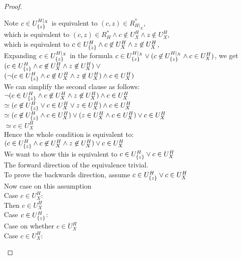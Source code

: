 \begin{proof}
\begin{tabbedproof}
\oo Note $c \in U^{H|_{X}}_{\{{z}\}}$ is equivalent to $(c,z) \in R^*_{H|_{X}}$, \\
\oo which is equivalent to  $(c, z) \in R^*_H \land c \not\in U^H_{X} \land z \not\in U^H_{X}$, \\
\oo which is equivalent to  $c \in U^H_{\{{z}\}} \land c \not\in U^H_{X} \land z \not\in U^H_{X}$, \\
\oo Expanding $c \in U^{H|_X}_{\{{z}\}}$ in the formula $c \in U^{H|_{X}}_{\{{z}\}} \vee (c \not\in U^{H|_{X}}_{\{{z}\}} \land c \in U^H_{X})$, we get \\
\oox $(c \in U^H_{\{{z}\}} \land c \not\in U^H_{X} \land z \not\in U^H_{X}) \;\vee$ \\
\oox $(\lnot(c \in U^H_{\{{z}\}} \land c \not\in U^H_{X} \land z \not\in U^H_{X}) \land c \in U^H_{X})$   \\
\oo We can simplify the second clause as follows: \\
\oo $\lnot(c \in U^H_{\{{z}\}} \land c \not\in U^H_{X} \land z \not\in U^H_{X}) \land c \in U^H_{X}$   \\
\ooo $\simeq (c \not\in U^H_{\{{z}\}} \vee c \in U^H_X \vee z \in U^H_X) \land c \in U^H_X$ \\
\ooo $\simeq (c \not\in U^H_{\{{z}\}} \land c \in U^H_X) \vee 
             (z \in U^H_X \land c \in U^H_X) \vee 
             c \in U^H_X$ \\
\ooo $\simeq c \in U^H_X$ \\
\oo Hence the whole condition is equivalent to:\\
\oox $(c \in U^H_{\{{z}\}} \land c \not\in U^H_{X} \land z \not\in U^H_{X}) \vee c \in U^H_{X}$ \\
\oo We want to show this is equivalent to $c \in U^H_{\{{z}\}} \vee c \in U^H_{X}$ \\
\oo The forward direction of the equivalence trivial. \\
\oo To prove the backwards direction, assume $c \in U^H_{\{{z}\}} \vee c \in U^H_{X}$ \\
\ooo Now case on this assumption \\
\ooo Case $c \in U^H_{X}$: \\
\oooo Then $c \in U^H_{X}$ \\
\ooo Case $c \in U^H_{\{{z}\}}$: \\ 
\oooo Case on whether $c \in U^H_{X}$ \\
\oooo Case $c \in U^H_{X}$: \\

\end{tabbedproof}
\end{proof}
